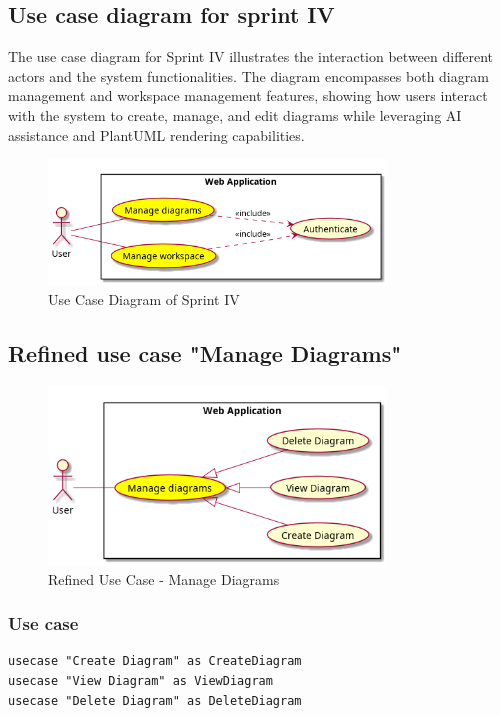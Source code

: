 \subsection{Use case diagram for sprint IV}
The use case diagram for Sprint IV illustrates the interaction between different actors and the system functionalities. The diagram encompasses both diagram management and workspace management features, showing how users interact with the system to create, manage, and edit diagrams while leveraging AI assistance and PlantUML rendering capabilities.

\begin{figure}[H]
\centering
\includegraphics[width=0.8\textwidth]{conception/SprintIV/use_case_diagrams/use_case_diagram_of_SprintIV.png}
\caption{Use Case Diagram of Sprint IV}
\end{figure}

\subsection{Refined use case "Manage Diagrams"}

\begin{figure}[H]
\centering
\includegraphics[width=0.8\textwidth]{conception/SprintIV/use_case_diagrams/refined_use_case_feature_diagram_management.png}
\caption{Refined Use Case - Manage Diagrams}
\end{figure}

\subsubsection{Use case}
\begin{verbatim}
usecase "Create Diagram" as CreateDiagram
usecase "View Diagram" as ViewDiagram  
usecase "Delete Diagram" as DeleteDiagram
\end{verbatim}

